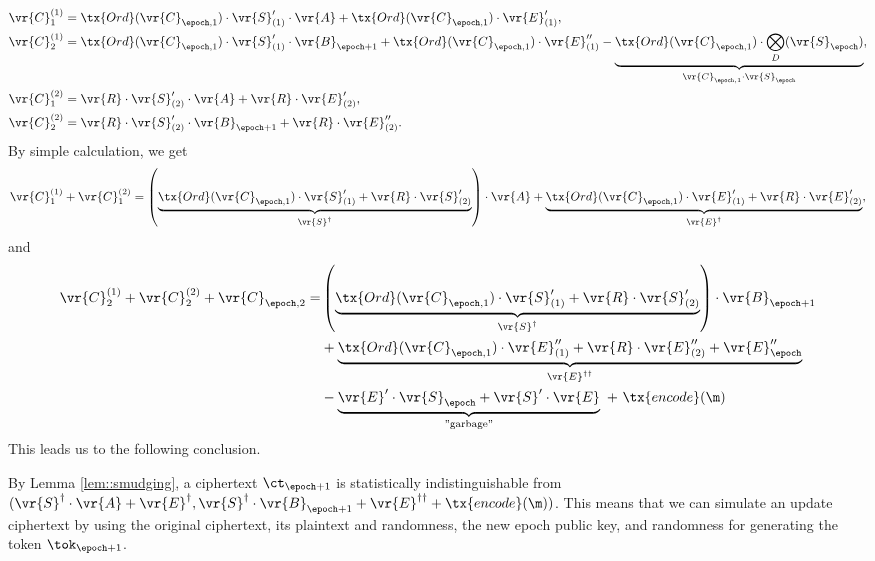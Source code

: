 \documentclass{fundam}
\begin{document}
\begin{align*}
	 \vr{C}_{1}^{(1)} &= \tx{Ord}(\vr{C}_{\epoch , 1})\cdot\vr{S}_{(1)}'  \cdot \vr{A} + \tx{Ord}(\vr{C}_{\epoch , 1})\cdot \vr{E}_{(1)}' ,     \\
	 \vr{C}_{2}^{(1)} &=   \tx{Ord}(\vr{C}_{\epoch , 1})\cdot \vr{S}_{(1)}' \cdot \vr{B}_{\epoch+1} + \tx{Ord}(\vr{C}_{\epoch , 1})\cdot \vr{E}_{(1)}''  -   \underbrace{\tx{Ord}(\vr{C}_{\epoch , 1})\cdot \bigotimes_{D} (\vr{S}_{\epoch}) }_{\vr{C}_{\epoch , 1}\cdot \vr{S}_{\epoch}}, \\
	 	\vr{C}_{1}^{(2)} &= \vr{R}\cdot \vr{S}_{(2)}' \cdot \vr{A} + \vr{R}\cdot \vr{E}_{(2)}'  ,\\
	 \vr{C}_{2}^{(2)} &= \vr{R}\cdot \vr{S}_{(2)}' \cdot \vr{B}_{\epoch+1} + \vr{R}\cdot \vr{E}_{(2)}''.
\end{align*}
By simple calculation, we get
\begin{align*}
 \vr{C}_{1}^{(1)} + \vr{C}_{1}^{(2)}  = \left(  \underbrace{\tx{Ord}(\vr{C}_{\epoch , 1})\cdot \vr{S}_{(1)}'  +  \vr{R}\cdot \vr{S}_{(2)}' }_{\vr{S}^{\dagger}}  \right) \cdot \vr{A}  + \underbrace{\tx{Ord}(\vr{C}_{\epoch , 1})\cdot \vr{E}_{(1)}' + \vr{R}\cdot \vr{E}_{(2)}' }_{\vr{E}^{\dagger}} ,
\end{align*}
and
\begin{align*}
 \vr{C}_{2}^{(1)}  +  \vr{C}_{2}^{(2)}  + \vr{C}_{\epoch,2}  = & \left(  \underbrace{\tx{Ord}(\vr{C}_{\epoch , 1})\cdot \vr{S}_{(1)}'  +  \vr{R}\cdot \vr{S}_{(2)}' }_{\vr{S}^{\dagger}}  \right) \cdot \vr{B}_{\epoch+1} \\
 & + \underbrace{\tx{Ord}(\vr{C}_{\epoch , 1})\cdot \vr{E}_{(1)}'' + \vr{R}\cdot \vr{E}_{(2)}'' +\vr{E}_{\epoch}''}_{\vr{E}^{\dagger\dagger}} \\
 &- \underbrace{\vr{E}'\cdot \vr{S}_{\epoch} + \vr{S}' \cdot \vr{E}}_{\text{''garbage''}}~ +  ~\tx{encode}(\m)
\end{align*}
%
This leads us to the following conclusion.
\begin{concl}\label{conc::01}
	By Lemma \ref{lem::smudging},  a ciphertext $\ct_{\epoch+1}$ is statistically indistinguishable from $(\vr{S}^{\dagger}\cdot\vr{A} + \vr{E}^{\dagger},  \vr{S}^{\dagger}\cdot\vr{B}_{\epoch+1} + \vr{E}^{\dagger\dagger} +  \tx{encode}(\m))$. This means that we can simulate an update ciphertext by using the original ciphertext, its plaintext and randomness, the new epoch public key, and randomness for generating the token $\tok_{\epoch+1}$.
\end{concl}
\end{document}
